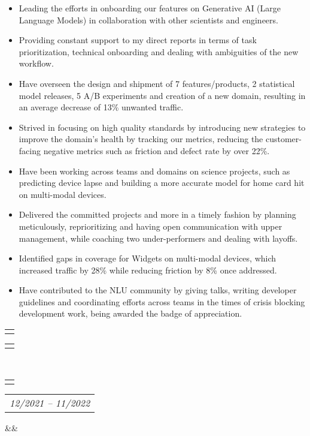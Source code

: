 \documentclass[12pt,letter,roman]{moderncv}        %
\makeatletter
\newcommand*{\customcventry}[7][.25em]{
  \begin{tabular}{@{}l} 
    {\bfseries #4}
  \end{tabular}
  \hfill%
  \begin{tabular}{l@{}}
     {\bfseries #5}
  \end{tabular} \\
  \begin{tabular}{@{}l} 
    {{\color{airforceblue}{\textbf{#3}}}}
  \end{tabular}
  \hfill%
  \begin{tabular}{l@{}}
     {\itshape #2}
  \end{tabular}
  \ifx&#7&%
  \else{\\%
    \begin{minipage}{\maincolumnwidth}%
      \small#7%
    \end{minipage}}\fi%
  \par\addvspace{#1}}
\makeatother
\begin{document}
{{{{\begin{itemize}
            \item{\small Leading the efforts in onboarding our features on Generative AI (Large Language Models) in collaboration with other scientists and engineers.}
            \item{\small  Providing constant support to my direct reports in terms of task prioritization, technical onboarding and dealing with ambiguities of the new workflow.}
            \item{\small   Have overseen the design and shipment of 7 features/products, 2 statistical model releases, 5 A/B experiments and creation of a new domain, resulting in an average decrease of 13\% unwanted traffic.}
             \item{\small  Strived in focusing on high quality standards by introducing new strategies to improve the domain's health by tracking our metrics, reducing the customer-facing negative metrics such as friction and defect rate by over 22\%.}
             \item{\small Have been working across teams and domains on science projects, such as predicting device lapse and building a more accurate model for home card hit on multi-modal devices.}
             \item{\small Delivered the committed projects and more in a timely fashion by planning meticulously, reprioritizing and having open communication with upper management, while coaching two under-performers and dealing with layoffs.}
             \item{\small Identified gaps in coverage for Widgets on multi-modal devices, which increased traffic by 28\% while reducing friction by 8\% once addressed.}
                          \item{\small Have contributed to the NLU community by giving talks, writing developer guidelines and coordinating efforts across teams in the times of crisis blocking development work, being awarded the badge of appreciation.}



             

        \end{itemize}
        
        \vspace{-0.5em}
        \newpage
        {\customcventry{12/2021 -- 11/2022}{Language Engineer II, Alexa Devices AI NLU }{}{}
{}{}
\vspace{0.2em}

}}}}}
\end{document}
